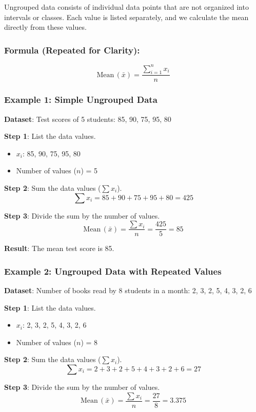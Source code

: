 \documentclass[11pt]{article}
\begin{document}
Ungrouped data consists of individual data points that are not organized into intervals or classes. Each value is listed separately, and we calculate the mean directly from these values.

\subsubsection*{Formula (Repeated for Clarity):}
\[
\text{Mean} \, (\bar{x}) = \frac{\sum_{i=1}^{n}x_i}{n}
\]

\subsubsection*{Example 1: Simple Ungrouped Data}
\textbf{Dataset}: Test scores of 5 students: 85, 90, 75, 95, 80

\textbf{Step 1}: List the data values.
\begin{itemize}
    \item $x_i$: 85, 90, 75, 95, 80
    \item Number of values ($n$) = 5
\end{itemize}

\textbf{Step 2}: Sum the data values ($\sum x_i$).
\[
\sum x_i = 85 + 90 + 75 + 95 + 80 = 425
\]

\textbf{Step 3}: Divide the sum by the number of values.
\[
\text{Mean} \, (\bar{x}) = \frac{\sum x_i}{n} = \frac{425}{5} = 85
\]

\textbf{Result}: The mean test score is 85.

\subsubsection*{Example 2: Ungrouped Data with Repeated Values}
\textbf{Dataset}: Number of books read by 8 students in a month: 2, 3, 2, 5, 4, 3, 2, 6

\textbf{Step 1}: List the data values.
\begin{itemize}
    \item $x_i$: 2, 3, 2, 5, 4, 3, 2, 6
    \item Number of values ($n$) = 8
\end{itemize}

\textbf{Step 2}: Sum the data values ($\sum x_i$).
\[
\sum x_i = 2 + 3 + 2 + 5 + 4 + 3 + 2 + 6 = 27
\]

\textbf{Step 3}: Divide the sum by the number of values.
\[
\text{Mean} \, (\bar{x}) = \frac{\sum x_i}{n} = \frac{27}{8} = 3.375
\]
\end{document}
